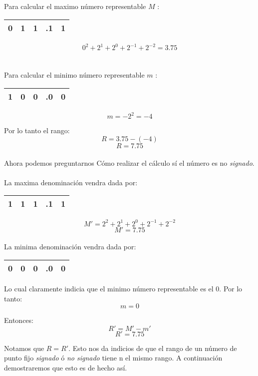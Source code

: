 Para calcular el maximo n\'umero representable $M$ :
\begin{center}
\begin{tabular}{ |ccccc| } 
 \hline
 0 & 1 & 1 & .1 & 1 \\ 
 \hline
\end{tabular}
\end{center}
$$ 0^2 + 2^1 + 2^0 +2^{-1} + 2^{-2}  = 3.75$$
\\\\
Para calcular el minimo n\'umero representable $m$ :
\begin{center}

\begin{tabular}{ |ccccc| } 
 \hline
 1 & 0 & 0 & .0 & 0 \\ 
 \hline
\end{tabular}
\end{center}
$$ m = -2^{2} = -4$$

Por lo tanto el rango: 
$$R = 3.75 - (-4 )$$ 
$$R = 7.75 $$
\\
\indent Ahora podemos preguntarnos  C\'omo realizar el c\'alculo s\'i el n\'umero es no \textit{signado}.
\\\\
La maxima denominaci\'on vendra dada por:
\begin{center}
\begin{tabular}{ |ccccc| } 
 \hline
 1 & 1 & 1 & .1 & 1 \\ 
 \hline
\end{tabular}
\end{center}

$$M' = 2^2 + 2^1 + 2^0 + 2^{-1} + 2^{-2}$$
$$M' = 7.75$$
\\
La minima denominaci\'on vendra dada por:
\begin{center}
\begin{tabular}{ |ccccc| } 
 \hline
 0 & 0 & 0 & .0 & 0 \\ 
 \hline
\end{tabular}
\end{center}

Lo cual claramente indicia que el minimo n\'umero representable es el $0$. Por lo tanto: $$m = 0$$




Entonces: 	$$R' = M' - m'$$
		 	$$R' = 7.75 $$
		 	
		 	
Notamos que $R = R'$. Esto nos da indicios de que el rango de un n\'umero de punto fijo \textit{signado} \'o \textit{no signado} tiene n el mismo rango. A continuaci\'on demostraremos que esto es de hecho as\'i.

